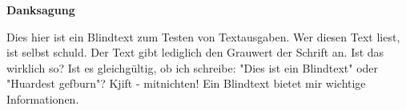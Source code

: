 %
\vspace*{\fill}
\begin{center}\textsf{\textbf{Danksagung}}\end{center}

\noindent Dies hier ist ein Blindtext zum Testen von Textausgaben. Wer diesen Text liest,
ist selbst schuld. Der Text gibt lediglich den Grauwert der Schrift an.
Ist das wirklich so? Ist es gleichgültig, ob ich schreibe: "Dies ist ein Blindtext"
oder "Huardest gefburn"? Kjift - mitnichten! Ein Blindtext bietet mir wichtige Informationen.

\vspace*{\fill}

